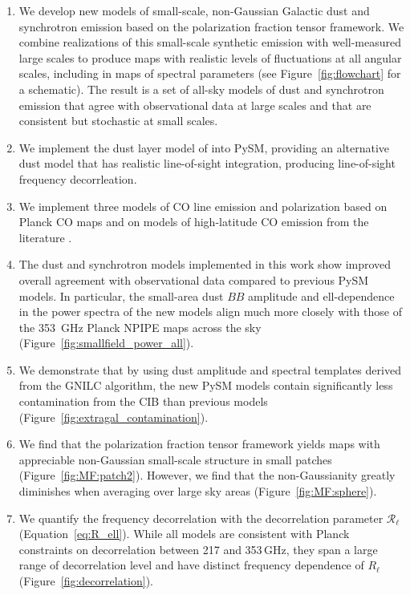 \documentclass[twocolumn]{aastex631}
\begin{document}
\begin{enumerate}
    \item We develop new models of small-scale, non-Gaussian Galactic dust and synchrotron emission based on the polarization fraction tensor framework. We combine realizations of this small-scale synthetic emission with well-measured large scales to produce maps with realistic levels of fluctuations at all angular scales, including in maps of spectral parameters (see Figure~\ref{fig:flowchart} for a schematic). The result is a set of all-sky models of dust and synchrotron emission that agree with observational data at large scales and that are consistent but stochastic at small scales.
    \item We implement the dust layer model of \citet{Martinez-Solaeche:2018} into PySM, providing an alternative dust model that has realistic line-of-sight integration, producing line-of-sight frequency decorrleation.
    \item We implement three models of CO line emission and polarization based on Planck CO maps \citep{planck2013-p03a} and on models of high-latitude CO emission from the literature \citep{Puglisi:2017}.
    \item The dust and synchrotron models implemented in this work show improved overall agreement with observational data compared to previous PySM models. In particular, the small-area dust $BB$ amplitude and ell-dependence in the power spectra of the new models align much more closely with those of the 353~GHz Planck NPIPE maps across the sky (Figure~\ref{fig:smallfield_power_all}).
    \item We demonstrate that by using dust amplitude and spectral templates derived from the GNILC algorithm, the new PySM models contain significantly less contamination from the CIB than previous models (Figure~\ref{fig:extragal_contamination}).
    \item We find that the polarization fraction tensor framework yields maps with appreciable non-Gaussian small-scale structure in small patches (Figure~\ref{fig:MF:patch2}). However, we find that the non-Gaussianity greatly diminishes when averaging over large sky areas (Figure~\ref{fig:MF:sphere}).
    \item We quantify the frequency decorrelation with the decorrelation parameter $\mathcal{R}_\ell$ (Equation~\eqref{eq:R_ell}). While all models are consistent with Planck constraints on decorrelation between 217 and 353\,GHz, they span a large range of decorrelation level and have distinct frequency dependence of $R_\ell$ (Figure~\ref{fig:decorrelation}).

\end{enumerate}
\end{document}
